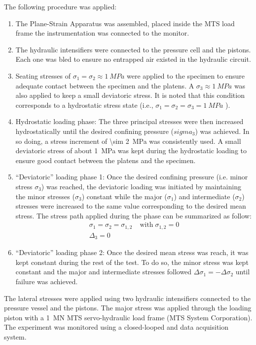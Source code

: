 The following procedure was applied:  

\begin{enumerate}
    \item The Plane-Strain Apparatus was assembled, placed inside the MTS load frame the instrumentation was connected to the monitor.
    \item The hydraulic intensifiers were connected to the pressure cell and the pistons. Each one was bled to ensure no entrapped air existed in the hydraulic circuit. 
    \item Seating stresses of $\sigma_1 = \sigma_2 \approx \SI{1}{MPa}$ were applied to the specimen to ensure adequate contact between the specimen and the platens. A $\sigma_3 \approx \SI{1}{MPa}$ was also applied to keep a small deviatoric stress. It is noted that this condition corresponds to a hydrostatic stress state (i.e.,  $\sigma_1 = \sigma_2 = \sigma_3 = \SI{1}{MPa}$ ).
    \item Hydrostatic loading phase: The three principal stresses were then increased hydrostatically until the desired confining pressure ($sigma_3$) was achieved. In so doing, a stress increment of \SI{\sim 2}{MPa} was consistently used. A small deviatoric stress of about \SI{1}{MPa} was kept during the hydrostatic loading to ensure good contact between the platens and the specimen.
    \item “Deviatoric” loading phase 1: Once the desired confining pressure (i.e. minor stress $\sigma_3$) was reached, the deviatoric loading was initiated by maintaining the minor stresses ($\sigma_3$) constant while the major ($\sigma_1$) and intermediate ($\sigma_2$) stresses were increased to the same value corresponding to the desired mean stress. The stress path applied during the phase can be summarized as follow:
    \begin{align}
        \sigma_1 = \sigma_2 = \sigma_{1,2}& \; \text{with} \; \sigma_{1,2} = 0\\
        \Delta_3 = 0
    \end{align}
    \item “Deviatoric” loading phase 2: Once the desired mean stress was reach, it was kept constant during the rest of the test. To do so, the minor stress was kept constant and the major and intermediate stresses followed $\Delta\sigma_1 = -\Delta\sigma_2$ until failure was achieved. 
\end{enumerate}

The lateral stresses were applied using two hydraulic intensifiers connected to the pressure vessel and the pistons. The major stress was applied through the loading piston with a \SI{1}{\mega\newton} MTS servo-hydraulic load frame (MTS System Corporation). The experiment was monitored using a closed-looped and data acquisition system. 


